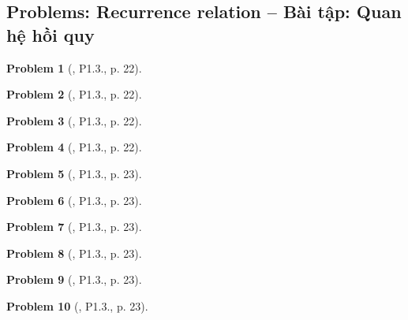 \documentclass[oneside]{book}
\newtheorem{problem}{Problem}
\begin{document}

\subsection{Problems: Recurrence relation -- Bài tập: Quan hệ hồi quy}

\begin{problem}[\cite{Shahriari2022}, P1.3., p. 22]
	
\end{problem}

\begin{problem}[\cite{Shahriari2022}, P1.3., p. 22]
	
\end{problem}

\begin{problem}[\cite{Shahriari2022}, P1.3., p. 22]
	
\end{problem}

\begin{problem}[\cite{Shahriari2022}, P1.3., p. 22]
	
\end{problem}

\begin{problem}[\cite{Shahriari2022}, P1.3., p. 23]
	
\end{problem}

\begin{problem}[\cite{Shahriari2022}, P1.3., p. 23]
	
\end{problem}

\begin{problem}[\cite{Shahriari2022}, P1.3., p. 23]
	
\end{problem}

\begin{problem}[\cite{Shahriari2022}, P1.3., p. 23]
	
\end{problem}

\begin{problem}[\cite{Shahriari2022}, P1.3., p. 23]
	
\end{problem}

\begin{problem}[\cite{Shahriari2022}, P1.3., p. 23]
	
\end{problem}
\end{document}

